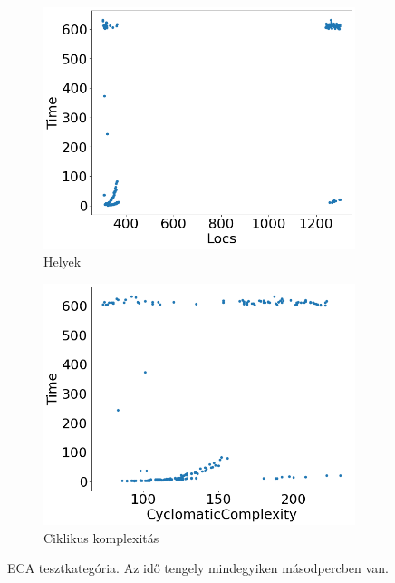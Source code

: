 \begin{figure}[ht]
\begin{subfigure}[b]{0.5\linewidth}
		\includegraphics[width=0.95\linewidth]{figures/eca/locs.png} 
		\caption{Helyek} 
		\label{fig7:c} 
	\end{subfigure}%
	\begin{subfigure}[b]{0.5\linewidth}
		\centering
		\includegraphics[width=0.95\linewidth]{figures/eca/cc.png} 
		\caption{Ciklikus komplexitás} 
		\label{fig7:d} 
	\end{subfigure} 
	\caption{ECA tesztkategória. Az idő tengely mindegyiken másodpercben van.}
	\label{fig_eca} 
\end{figure}